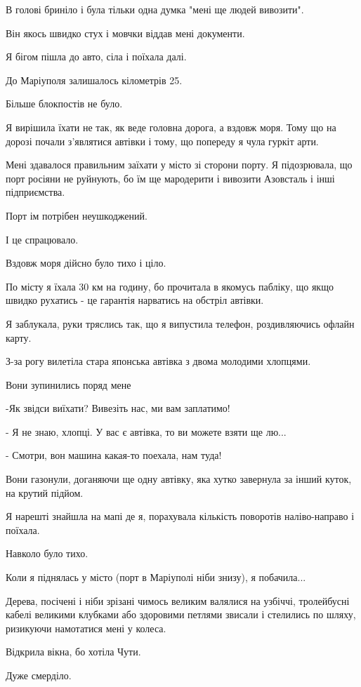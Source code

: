 В голові бриніло і була тільки одна думка "мені ще людей вивозити".

Він якось швидко стух і мовчки віддав мені документи. 

Я бігом пішла до авто, сіла і поїхала далі.

До Маріуполя залишалось кілометрів 25.

Більше блокпостів не було.

Я вирішила їхати не так, як веде головна дорога, а вздовж моря. Тому що на
дорозі почали з'являтися автівки і тому, що попереду я чула гуркіт арти.

Мені здавалося правильним заїхати у місто зі сторони порту. Я підозрювала, що
порт росіяни не руйнують, бо їм ще мародерити і вивозити Азовсталь і інші
підприємства. 

Порт ім потрібен неушкоджений. 

І це спрацювало.

Вздовж моря дійсно було тихо і ціло.

По місту я їхала 30 км на годину, бо прочитала в якомусь пабліку, що якщо
швидко рухатись - це гарантія нарватись на обстріл автівки.

Я заблукала, руки тряслись так, що я випустила телефон, роздивляючись офлайн
карту.

З-за рогу вилетіла стара японська автівка з двома молодими хлопцями.

Вони зупинились поряд мене

-Як звідси виїхати? Вивезіть нас, ми вам заплатимо!

- Я не знаю, хлопці. У вас є автівка, то ви можете взяти ще лю...

- Смотри, вон машина какая-то поехала, нам туда!

Вони газонули, доганяючи ще одну автівку, яка хутко завернула за інший куток,
на крутий підйом.

Я нарешті знайшла на мапі де я, порахувала кількість поворотів наліво-направо і
поїхала. 

Навколо було тихо. 

Коли я піднялась у місто (порт в Маріуполі ніби знизу), я побачила...

Дерева, посічені і ніби зрізані чимось великим валялися на узбіччі, тролейбусні
кабелі великими клубками або здоровими петлями звисали і стелились по шляху,
ризикуючи намотатися мені у колеса.

Відкрила вікна, бо хотіла Чути.

Дуже смерділо.

